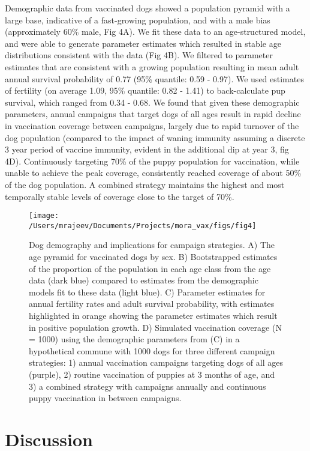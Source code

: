 \documentclass[tropicalmed,article,submit,moreauthors,pdftex]{mdpi}
\begin{document}
Demographic data from vaccinated dogs showed a population pyramid with a
large base, indicative of a fast-growing population, and with a male
bias (approximately 60\% male, Fig 4A). We fit these data to an
age-structured model, and were able to generate parameter estimates
which resulted in stable age distributions consistent with the data (Fig
4B). We filtered to parameter estimates that are consistent with a
growing population resulting in mean adult annual survival probability
of 0.77 (95\% quantile: 0.59 - 0.97). We used estimates of fertility (on
average 1.09, 95\% quantile: 0.82 - 1.41) to back-calculate pup
survival, which ranged from 0.34 - 0.68. We found that given these
demographic parameters, annual campaigns that target dogs of all ages
result in rapid decline in vaccination coverage between campaigns,
largely due to rapid turnover of the dog population (compared to the
impact of waning immunity assuming a discrete 3 year period of vaccine
immunity, evident in the additional dip at year 3, fig 4D). Continuously
targeting 70\% of the puppy population for vaccination, while unable to
achieve the peak coverage, consistently reached coverage of about 50\%
of the dog population. A combined strategy maintains the highest and
most temporally stable levels of coverage close to the target of 70\%.

\begin{figure}
\texttt{[image: /Users/mrajeev/Documents/Projects/mora\_vax/figs/fig4]} \caption{Dog demography and implications for campaign strategies. A) The age pyramid for vaccinated dogs by sex. B) Bootstrapped estimates of the proportion of the population in each age class from the age data (dark blue) compared to estimates from the demographic models fit to these data (light blue). C) Parameter estimates for annual fertility rates and adult survival probability, with estimates highlighted in orange showing the parameter estimates which result in positive population growth. D) Simulated vaccination coverage (N = 1000) using the demographic parameters from (C) in a hypothetical commune with 1000 dogs for three different campaign strategies: 1) annual vaccination campaigns targeting dogs of all ages (purple), 2) routine vaccination of puppies at 3 months of age, and 3) a combined strategy with campaigns annually and continuous puppy vaccination in between campaigns.}\label{fig:fig4}
\end{figure}

\hypertarget{discussion}{%
\section{Discussion}\label{discussion}}
\end{document}
